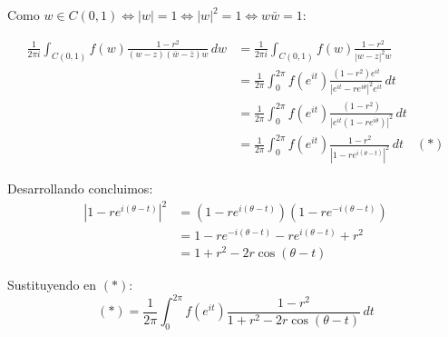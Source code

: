 {Como $w \in C(0,1) \iff |w|=1 \iff |w|^2=1 \iff w\bar{w}=1$:

\begin{align*}
\frac{1}{2\pi i} \int_{C(0,1)} f(w) \frac{1-r^2}{(w-z)(\bar{w}-\bar{z})w} \, dw 
&= \frac{1}{2\pi i} \int_{C(0,1)} f(w) \frac{1-r^2}{|w-z|^2 w} \\
&= \frac{1}{2\pi} \int_{0}^{2\pi} f(e^{it}) \frac{(1-r^2)  e^{it}}{|e^{it}-re^{i\theta}|^2  e^{it}} \, dt \\
&= \frac{1}{2\pi} \int_{0}^{2\pi} f(e^{it}) \frac{(1-r^2)}{|e^{it}(1-re^{i\theta})|^2} \, dt \\
&= \frac{1}{2\pi} \int_{0}^{2\pi} f(e^{it}) \frac{1-r^2}{|1-re^{i(\theta-t)}|^2} \, dt \quad (*)
\end{align*}

Desarrollando concluimos:
\begin{align*}
|1 - re^{i(\theta-t)}|^2 &= (1 - re^{i(\theta-t)})(1 - re^{-i(\theta-t)}) \\
&= 1 - re^{-i(\theta-t)} - re^{i(\theta-t)} + r^2 \\
&= 1 + r^2 - 2r\cos(\theta-t)
\end{align*}

Sustituyendo en $(*)$:
$$ (*) = \frac{1}{2\pi} \int_{0}^{2\pi} f(e^{it}) \frac{1-r^2}{1+r^2-2r\cos(\theta-t)} \, dt $$
}

